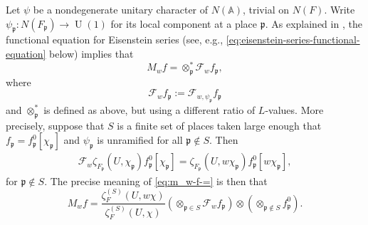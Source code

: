 \documentclass[reqno]{amsart}
\DeclareMathOperator{\U}{U}
\theoremstyle{plain} \newtheorem{theorem} {Theorem}
\theoremstyle{definition} \newtheorem{definition} [theorem] {Definition}
\theoremstyle{itplain} %
\numberwithin{equation}{section}
\numberwithin{theorem}{section}
\renewcommand{\geq}{\geqslant}
\begin{document}
Let $\psi$ be a nondegenerate unitary character of $N(\mathbb{A})$, trivial on $N(F)$.  Write $\psi_\mathfrak{p} : N(F_\mathfrak{p}) \rightarrow \U(1)$ for its local component at a place $\mathfrak{p}$.  As explained in \cite[\S4]{MR610479}, the functional equation for Eisenstein series (see, e.g., \eqref{eq:eisenstein-series-functional-equation} below) implies that
\begin{equation}\label{eq:m_w-f-=}
  M_w f = \otimes_{\mathfrak{p}}^* \mathcal{F}_{w} f_\mathfrak{p},
\end{equation}
where
\begin{equation*}
  \mathcal{F}_{w} f_\mathfrak{p} := \mathcal{F}_{w,\psi_\mathfrak{p}} f_\mathfrak{p}
\end{equation*}
and $\otimes^*_{\mathfrak{p}}$ is defined as above, but using a different ratio of $L$-values.  More precisely, suppose that $S$ is a finite set of places taken large enough that $f_\mathfrak{p} = f_\mathfrak{p}^0[\chi_\mathfrak{p}]$ and $\psi_\mathfrak{p}$ is unramified for all $\mathfrak{p} \notin S$.  Then
\begin{align*}
  \mathcal{F}_{w} \zeta_{F_\mathfrak{p}}(U, \chi_\mathfrak{p}) f_\mathfrak{p}^0[\chi_\mathfrak{p}] =
  \zeta_{F_\mathfrak{p}}(U,w \chi_\mathfrak{p})f_\mathfrak{p}^0[w \chi_\mathfrak{p}],
\end{align*}
for $\mathfrak{p} \notin S$.  The precise meaning of \eqref{eq:m_w-f-=} is then that
\begin{equation}\label{eq:m_w-f-=-1}
  M_w f
  =
  \frac{
    \zeta_F^{(S)}(U,w \chi)
  }{
    \zeta_F^{(S)}(U,\chi)
  }
  (\otimes_{\mathfrak{p} \in S}
  \mathcal{F}_w f_\mathfrak{p} ) \otimes (
  \otimes_{\mathfrak{p} \notin S} f_\mathfrak{p}^0).
\end{equation}
\end{document}
